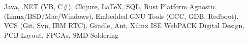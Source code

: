 {Java, .NET (VB, C\#), Clojure, \LaTeX, SQL, Rust}
{Platform Agnostic (Linux/BSD/Mac/Windows), Embedded GNU Tools (GCC, GDB, Redboot), VCS (Git, Svn, IBM RTC), Gradle, Ant, Xilinx ISE WebPACK}
{Digital Design, PCB Layout, FPGAs, SMD Soldering}
